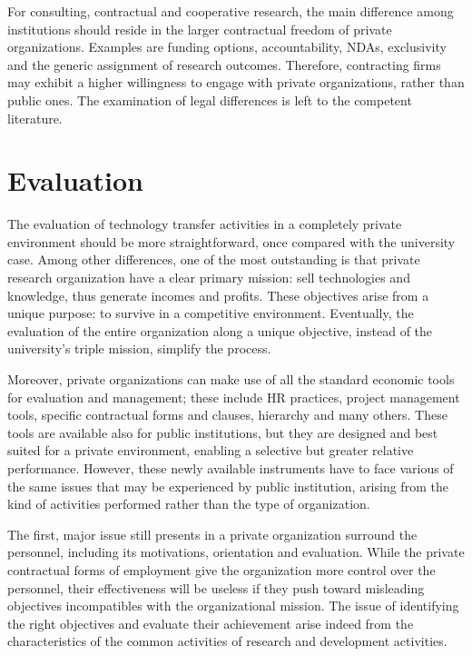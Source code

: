 For consulting, contractual and cooperative research, the main difference among institutions should reside in the larger contractual freedom of private organizations. Examples are funding options, accountability, NDAs, exclusivity and the generic assignment of research outcomes. Therefore, contracting firms may exhibit a higher willingness to engage with private organizations, rather than public ones. The examination of legal differences is left to the competent literature.

\section{Evaluation}

The evaluation of technology transfer activities in a completely private environment should be more straightforward, once compared with the university case. Among other differences, one of the most outstanding is that private research organization have a clear primary mission: sell technologies and knowledge, thus generate incomes and profits. These objectives arise from a unique purpose: to survive in a competitive environment. Eventually, the evaluation of the entire organization along a unique objective, instead of the university's triple mission, simplify the process. 

Moreover, private organizations can make use of all the standard economic tools for evaluation and management; these include HR practices, project management tools, specific contractual forms and clauses, hierarchy and many others. These tools are available also for public institutions, but they are designed and best suited for a private environment, enabling a selective but greater relative performance. However, these newly available instruments have to face various of the same issues that may be experienced by public institution, arising from the kind of activities performed rather than the type of organization.

The first, major issue still presents in a private organization surround the personnel, including its motivations, orientation and evaluation. While the private contractual forms of employment give the organization more control over the personnel, their effectiveness will be useless if they push toward misleading objectives incompatibles with the organizational mission. The issue of identifying the right objectives and evaluate their achievement arise indeed from the characteristics of the common activities of research and development activities.

